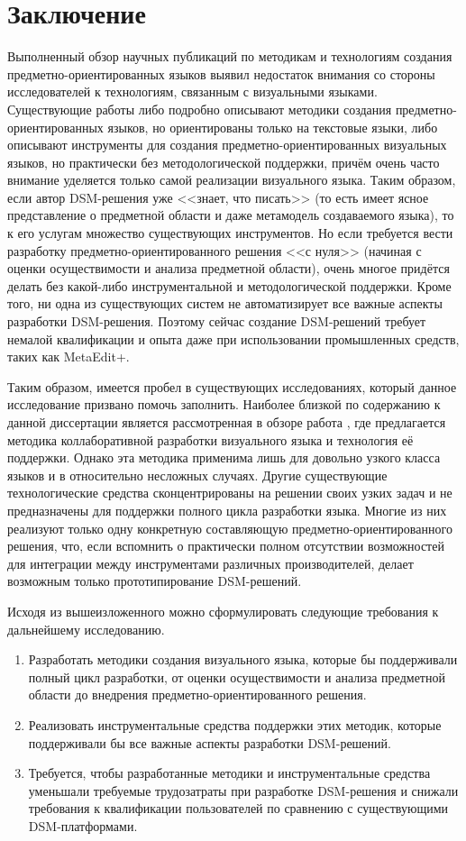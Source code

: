 \section{Заключение}
Выполненный обзор научных публикаций по методикам и технологиям создания предметно-ориентированных 
языков выявил недостаток внимания со стороны исследователей к технологиям, связанным 
с визуальными языками. Существующие работы либо подробно описывают методики создания 
предметно-ориентированных языков, но ориентированы только на текстовые языки, либо 
описывают инструменты для создания предметно-ориентированных визуальных языков, но 
практически без методологической поддержки, причём очень часто внимание уделяется 
только самой реализации визуального языка. Таким образом, если автор \ac{DSM}-решения уже 
<<знает, что писать>> (то есть имеет ясное представление о предметной области и даже метамодель 
создаваемого языка), то к его услугам множество существующих инструментов. Но если требуется вести разработку 
предметно-ориентированного решения <<с нуля>> (начиная с оценки осуществимости и анализа предметной области), 
очень многое придётся делать без какой-либо инструментальной и методологической поддержки.
Кроме того, ни одна из существующих систем не автоматизирует все важные аспекты разработки \ac{DSM}-решения.
Поэтому сейчас создание \ac{DSM}-решений требует немалой квалификации и опыта даже при 
использовании промышленных средств, таких как MetaEdit+.

Таким образом, имеется пробел в существующих исследованиях, который данное исследование
призвано помочь заполнить. Наиболее близкой по содержанию к данной диссертации является
рассмотренная в обзоре работа \cite{repenning1995agentsheets}, где предлагается методика
коллаборативной разработки визуального языка и технология её поддержки. Однако эта
методика применима лишь для довольно узкого класса языков и в относительно несложных
случаях. Другие существующие технологические средства сконцентрированы на решении
своих узких задач и не предназначены для поддержки полного цикла разработки языка.
Многие из них реализуют только одну конкретную составляющую предметно-ориентированного
решения, что, если вспомнить о практически полном отсутствии возможностей для интеграции
между инструментами различных производителей, делает возможным только прототипирование
\ac{DSM}-решений.

Исходя из вышеизложенного можно сформулировать следующие требования к дальнейшему исследованию.
\begin{enumerate}
	\item Разработать методики создания визуального языка, которые бы поддерживали полный цикл
		разработки, от оценки осуществимости и анализа предметной области до внедрения
		предметно-ориентированного решения.
	\item Реализовать инструментальные средства поддержки этих методик, которые поддерживали
		бы все важные аспекты разработки \ac{DSM}-решений. 
	\item Требуется, чтобы разработанные методики и инструментальные средства уменьшали 
		требуемые трудозатраты при разработке \ac{DSM}-решения и снижали требования к квалификации 
		пользователей по сравнению с существующими \ac{DSM}-платформами.
\end{enumerate}
